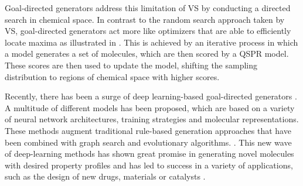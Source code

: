 Goal-directed generators address this limitation of \ac{VS} by conducting a directed search in chemical
space. In contrast to the random search approach taken by \ac{VS},
goal-directed generators act more like optimizers that are able to efficiently locate maxima as
illustrated in . This is achieved by an iterative process in
which a model generates a set of molecules, which are then scored by a \ac{QSPR} model. These scores
are then used to update the model, shifting the sampling distribution to regions of chemical space
with higher scores.

Recently, there has been a surge of deep learning-based goal-directed generators
\citep{eltonDeepLearningMolecular2019,sanchez-lengelingInverseMolecularDesign2018,duMachineLearningaidedGenerative2024}.
A multitude of different models has been proposed, which are based on a variety of neural network
architectures, training strategies and molecular representations. These methods augment traditional
rule-based generation approaches that have been combined with graph search and evolutionary
algorithms. \citep{schneiderComputerbasedNovoDesign2005,schneiderNovoMolecularDesign2013}. This new
wave of deep-learning methods has shown great promise in generating novel molecules with desired
property profiles and has led to success in a variety of applications, such as the design of new drugs,
materials or catalysts \citep{zahrtPredictionHigherselectivityCatalysts2019,daveAutonomousDiscoveryBattery2020,kimDatadrivenElectrolyteDesign2023,moonActiveLearningGuides2024}.

